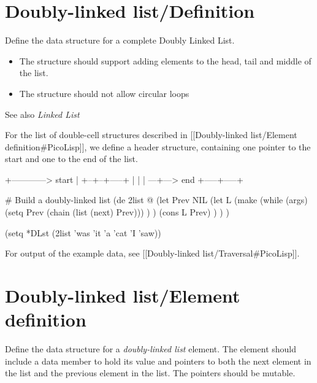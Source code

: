 \pagebreak{}
\section*{Doubly-linked list/Definition}

Define the data structure for a complete Doubly Linked List.

\begin{itemize}
\item
  The structure should support adding elements to the head, tail and
  middle of the list.
\item
  The structure should not allow circular loops
\end{itemize}

See also \emph{Linked List}


\begin{wideverbatim}

For the list of double-cell structures described in
[[Doubly-linked list/Element definition#PicoLisp]],
we define a header structure, containing one pointer to the start
and one to the end of the list.

            +------------> start
            |
         +--+--+-----+
         |  |  |  ---+---> end
         +-----+-----+

# Build a doubly-linked list
(de 2list @
   (let Prev NIL
      (let L
         (make
            (while (args)
               (setq Prev (chain (list (next) Prev))) ) )
         (cons L Prev) ) ) )

(setq *DLst (2list 'was 'it 'a 'cat 'I 'saw))

For output of the example data, see [[Doubly-linked list/Traversal#PicoLisp]].

\end{wideverbatim}

\pagebreak{}
\section*{Doubly-linked list/Element definition}

Define the data structure for a \emph{doubly-linked list} element. The
element should include a data member to hold its value and pointers to
both the next element in the list and the previous element in the
list. The pointers should be mutable.

